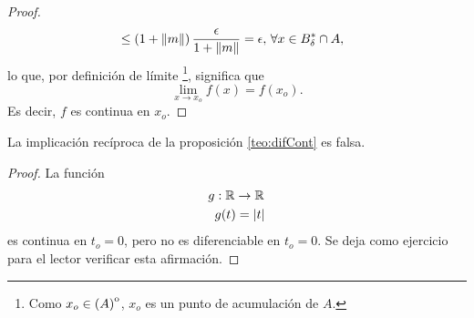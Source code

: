 \begin{theorem}
\begin{proof}
\begin{align*}
                       &\le \left( 1 + \norm{m} \right) \frac{\epsilon}{1 + \norm{m}} = \epsilon, 
                       \, \forall x \in B^*_{\delta} \cap A,
\end{align*}
lo que, por definici\'on de l\'imite \footnote{Como $x_o \in {\kern0pt(A)}^{\mathrm{o}}$, $x_o$ es un punto de acumulaci\'on de $A$. }, significa que 
\[
 \lim_{x \to x_o}f(x) = f(x_o).
\]
Es decir, $f$ es continua en $x_o$.
\end{proof}
\begin{obs} La implicaci\'on rec\'iproca de la proposici\'on \eqref{teo:difCont} es falsa. 
 \begin{proof} La funci\'on
  \begin{align*}
      g & :\mathbb{R} \to \mathbb{R} \\
        & g(t) = \abs{t}
 \end{align*}
es continua en $t_o = 0$, pero no es diferenciable en $t_o = 0$. Se deja como ejercicio para el lector verificar esta afirmaci\'on.
 \end{proof}
\end{obs}
\end{theorem}

